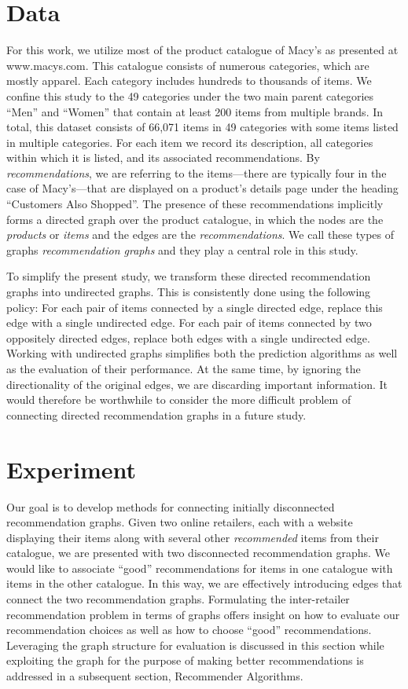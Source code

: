 \documentclass[11pt]{article}
\begin{document}
\section*{Data}
For this work, we utilize most of the product catalogue of Macy's as presented
at www.macys.com. This catalogue consists of numerous categories, which are
mostly apparel. Each category includes hundreds to thousands of items. We
confine this study to the 49 categories under the two main parent categories
``Men'' and ``Women'' that contain at least 200 items from multiple brands.  In
total, this dataset consists of 66,071 items in 49 categories with some items
listed in multiple categories. For each item we record its description, all
categories within which it is listed, and its associated recommendations. By
{\em recommendations}, we are referring to the items---there are typically four
in the case of Macy's---that are displayed on a product's details page under the
heading ``Customers Also Shopped''. The presence of these recommendations
implicitly forms a directed graph over the product catalogue, in which the nodes
are the {\em products} or {\em items} and the edges are the {\em
recommendations}. We call these types of graphs {\em recommendation graphs} and
they play a central role in this study.

To simplify the present study, we transform these directed recommendation graphs
into undirected graphs. This is consistently done using the following policy:
For each pair of items connected by a single directed edge, replace this edge
with a single undirected edge. For each pair of items connected by two
oppositely directed edges, replace both edges with a single undirected edge.
Working with undirected graphs simplifies both the prediction algorithms as well
as the evaluation of their performance. At the same time, by ignoring the
directionality of the original edges, we are discarding important information.
It would therefore be worthwhile to consider the more difficult problem of
connecting directed recommendation graphs in a future study.

\section*{Experiment}
Our goal is to develop methods for connecting initially disconnected
recommendation graphs. Given two online retailers, each with a website
displaying their items along with several other {\em recommended} items from
their catalogue, we are presented with two disconnected recommendation graphs.
We would like to associate ``good'' recommendations for items in one catalogue
with items in the other catalogue. In this way, we are effectively introducing
edges that connect the two recommendation graphs. Formulating the inter-retailer
recommendation problem in terms of graphs offers insight on how to evaluate our
recommendation choices as well as how to choose ``good'' recommendations.
Leveraging the graph structure for evaluation is discussed in this section while
exploiting the graph for the purpose of making better recommendations is
addressed in a subsequent section, Recommender Algorithms.
\end{document}
